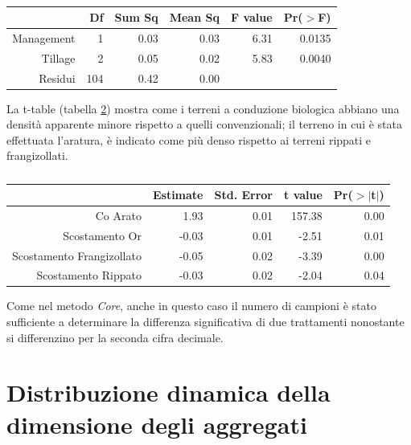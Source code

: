 \documentclass[11pt, a4paper, openright, titlepage, final, language = italian]{book}
\begin{document}
\begin{table}[ht]
\centering
\caption{} 
\label{tab:anova piccoli aggregati}
\begin{tabular}{rrrrrr}
  \hline
 & Df & Sum Sq & Mean Sq & F value & Pr($>$F) \\ 
  \hline
Management & 1 & 0.03 & 0.03 & 6.31 & 0.0135 \\ 
  Tillage & 2 & 0.05 & 0.02 & 5.83 & 0.0040 \\ 
  Residui & 104 & 0.42 & 0.00 &  &  \\ 
   \hline
\end{tabular}
\end{table}
La t-table (tabella \ref{tab:sommario piccoli aggregati}) mostra come i
terreni a conduzione biologica abbiano una densit\`a apparente minore
rispetto a quelli convenzionali; il terreno in cui \`e stata
effettuata l'aratura, \`e indicato come pi\`u denso rispetto ai
terreni rippati e frangizollati.



\begin{table}[ht]
\centering
\caption{} 
\label{tab:sommario piccoli aggregati}
\begin{tabular}{rrrrr}
  \hline
 & Estimate & Std. Error & t value & Pr($>$$|$t$|$) \\ 
  \hline
Co Arato & 1.93 & 0.01 & 157.38 & 0.00 \\ 
  Scostamento Or & -0.03 & 0.01 & -2.51 & 0.01 \\ 
  Scostamento Frangizollato & -0.05 & 0.02 & -3.39 & 0.00 \\ 
  Scostamento Rippato & -0.03 & 0.02 & -2.04 & 0.04 \\ 
   \hline
\end{tabular}
\end{table}
Come nel metodo \emph{Core}, anche in questo caso il numero di campioni
\`e stato sufficiente a determinare la differenza significativa di due
trattamenti nonostante si differenzino per la seconda cifra decimale.




\section{Distribuzione dinamica della dimensione degli aggregati}
\end{document}
